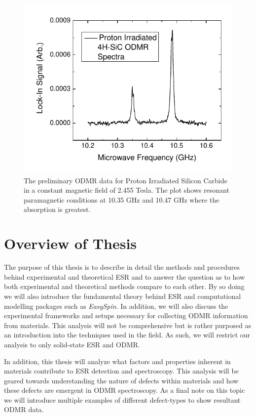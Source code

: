 \documentclass[oneside, astronomy, noacknowlegments]{BYUPhys}
\begin{document}
\begin{figure}
    \centerline{\includegraphics{p14-odmr}}
    \caption[Preliminary ODMR data]{\label{fig:PrelimODMR}
     The preliminary ODMR data for Proton Irradiated Silicon Carbide in a constant magnetic field of 2.455 Tesla. The plot shows resonant paramagnetic conditions at 10.35 GHz and 10.47 GHz where the absorption is greatest. }
\end{figure}

\section{Overview of Thesis}

The purpose of this thesis is to describe in detail the methods and procedures behind experimental and theoretical ESR and to answer the question as to how both experimental and theoretical methods compare to each other. By so doing we will also introduce the fundamental theory behind ESR and computational modelling packages such as \textit{EasySpin}. In addition, we will also discuss the experimental frameworks and setups necessary for collecting ODMR information from materials. This analysis will not be comprehensive but is rather purposed as an introduction into the techniques used in the field. As such, we will restrict our analysis to only solid-state ESR and ODMR.

In addition, this thesis will analyze what factors and properties inherent in materials contribute to ESR detection and spectroscopy. This analysis will be geared towards understanding the nature of defects within materials and how these defects are emergent in ODMR spectroscopy. As a final note on this topic we will introduce multiple examples of different defect-types to show resultant ODMR data.
\end{document}

